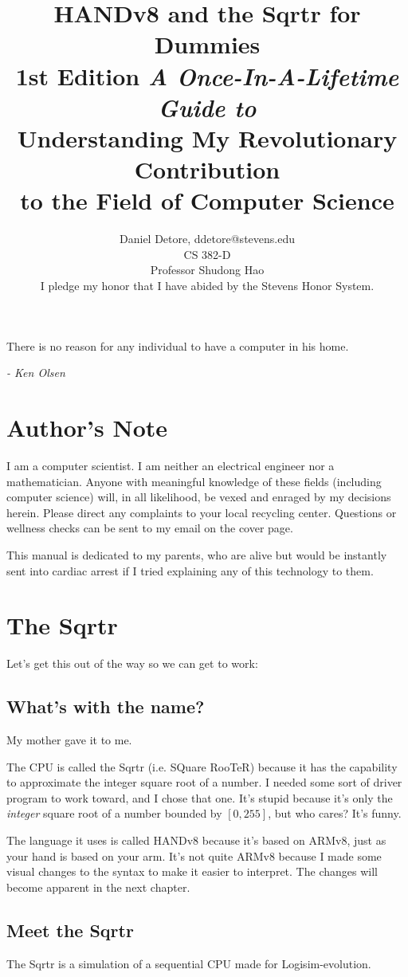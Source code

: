 \documentclass[12pt, oneside]{memoir}
\title{
    {\HUGE\bfseries HANDv8 and the Sqrtr for Dummies}\\
    {\large\bfseries 1st Edition}\linebreak\linebreak
    {\large\textit{A Once-In-A-Lifetime Guide to}}\\
    {\Large Understanding My Revolutionary Contribution\\to the Field of Computer Science}\linebreak\linebreak\linebreak\linebreak\linebreak\linebreak\linebreak\linebreak\linebreak\linebreak\linebreak\linebreak\linebreak
}
\author{
    {\Large Daniel Detore}, ddetore@stevens.edu\\
    CS 382-D\\
    Professor Shudong Hao\\
    {\small I pledge my honor that I have abided by the Stevens Honor System.}\\
}
\begin{document}
\frontmatter
\maketitle
\thispagestyle{empty}
\newpage

\epigraph{There is no reason for any individual to have a computer in his home.}{\textit{- Ken Olsen}}
\tableofcontents
\newpage

\setlength{\parindent}{1.5em}
\setlength{\parskip}{1em}

\chapter{Author's Note}
I am a computer scientist. I am neither an electrical engineer nor a mathematician. Anyone with meaningful knowledge of these fields (including computer science) will, in all likelihood, be vexed and enraged by my decisions herein. Please direct any complaints to your local recycling center. Questions or wellness checks can be sent to my email on the cover page.

This manual is dedicated to my parents, who are alive but would be instantly sent into cardiac arrest if I tried explaining any of this technology to them.

\mainmatter
\chapter{The Sqrtr}
Let's get this out of the way so we can get to work:
\section{What's with the name?}
My mother gave it to me.

The CPU is called the Sqrtr (i.e. SQuare RooTeR) because it has the capability to approximate the integer square root of a number. I needed some sort of driver program to work toward, and I chose that one. It's stupid because it's only the \emph{integer} square root of a number bounded by $[0, 255]$, but who cares? It's funny. 

The language it uses is called HANDv8 because it's based on ARMv8, just as your hand is based on your arm. It's not quite ARMv8 because I made some visual changes to the syntax to make it easier to interpret. The changes will become apparent in the next chapter.

\section{Meet the Sqrtr}
The Sqrtr is a simulation of a sequential CPU made for Logisim-evolution.
\end{document}
